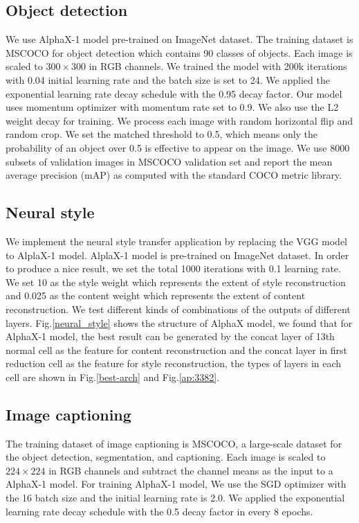 \documentclass[10pt,twocolumn,letterpaper]{article}
\begin{document}
\label{ap:setup_vision_models}
\subsection{Object detection}
We use AlphaX-1 model pre-trained on ImageNet dataset. The training dataset is MSCOCO for object detection\cite{LinMBHPRDZ14} which contains 90 classes of objects. Each image is scaled to $300\times300$ in RGB channels. We trained the model with 200k iterations with 0.04 initial learning rate and the batch size is set to 24. We applied the exponential learning rate decay schedule with the 0.95 decay factor. Our model uses momentum optimizer with momentum rate set to 0.9. We also use the L2 weight decay for training. We process each image with random horizontal flip and random crop\cite{liu2016ssd}. We set the matched threshold to 0.5, which means only the probability of an object over 0.5 is effective to appear on the image. We use 8000 subsets of validation images in MSCOCO validation set and report the mean average precision (mAP) as computed with the standard COCO metric library\cite{MSCOCO2014}. 

\subsection{Neural style}
We implement the neural style transfer application by replacing the VGG model to AlplaX-1 model\cite{neural_style}. AlplaX-1 model is pre-trained on ImageNet dataset. In order to produce a nice result, we set the total 1000 iterations with 0.1 learning rate. We set 10 as the style weight which represents the extent of style reconstruction and 0.025 as the content weight which represents the extent of content reconstruction. We test different kinds of combinations of the outputs of different layers. Fig.\ref{neural_style} shows the structure of AlphaX model, we found that for AlphaX-1 model, the best result can be generated by the concat layer of 13th normal cell as the feature for content reconstruction and the concat layer in first reduction cell as the feature for style reconstruction, the types of layers in each cell are shown in Fig.\ref{best-arch} and Fig.\ref{ap:3382}.

\subsection{Image captioning}
The training dataset of image captioning is MSCOCO\cite{LinMBHPRDZ14}, a large-scale dataset for the object detection, segmentation, and captioning. Each image is scaled to $224\times224$ in RGB channels and subtract the channel means as the input to a AlphaX-1 model. For training AlphaX-1 model, We use the SGD optimizer with the 16 batch size and the initial learning rate is 2.0. We applied the exponential learning rate decay schedule with the 0.5 decay factor in every 8 epochs.  
\end{document}
